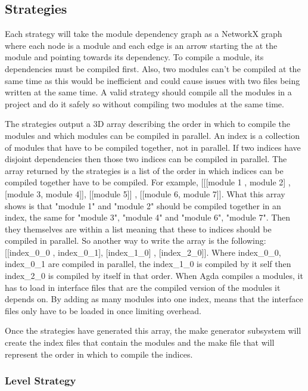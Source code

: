 \subsection{Strategies}

Each strategy will take the module dependency graph as a NetworkX graph where
each node is a module and each edge is an arrow starting the at the module and
pointing towards its dependency. To compile a module, its dependencies must be
compiled first. Also, two modules can't be compiled at the same time as this
would be inefficient and could cause issues with two files being written at the
same time. A valid strategy should compile all the modules in a project and do
it safely so without compiling two modules at the same time. 

The strategies output a 3D array describing the order in which to compile the
modules and which modules can be compiled in parallel. An index is a collection
of modules that have to be compiled together, not in parallel. If two indices
have disjoint dependencies then those two indices can be compiled in parallel.
The array returned by the strategies is a list of the order in which indices
can be compiled together have to be compiled. For example, [[[module 1 , module
2] , [module 3, module 4]], [[module 5]] , [[module 6, module 7]]. What this
array shows is that "module 1" and "module 2" should be compiled together in an
index, the same for "module 3", "module 4" and "module 6", "module 7". Then
they themselves are within a list meaning that these to indices should be
compiled in parallel. So another way to write the array is the following:
[[index\_0\_0 , index\_0\_1], [index\_1\_0] , [index\_2\_0]]. Where
index\_0\_0, index\_0\_1 are compiled in parallel, the index\_1\_0 is compiled
by it self then index\_2\_0 is compiled by itself in that order. When Agda
compiles a modules, it has to load in interface files that are the compiled
version of the modules it depends on. By adding as many modules into one index,
means that the interface files only have to be loaded in once limiting
overhead.

Once the strategies have generated this array, the make generator
subsystem will create the index files that contain the modules and the make
file that will represent the order in which to compile the indices.

\subsubsection{Level Strategy} \label{sub:imp lvl strategy}

